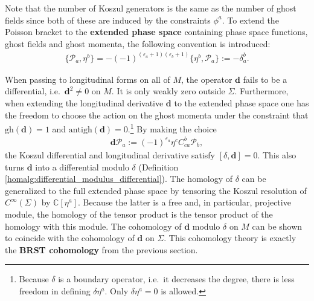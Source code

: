     Note that the number of Koszul generators is the same as the number of ghost fields since both of these are induced by the constraints $\phi^a$. To extend the Poisson bracket to the \textbf{extended phase space} containing phase space functions, ghost fields and ghost momenta, the following convention is introduced:
    \begin{gather}
        \{\mathcal{P}_a,\eta^b\} = -(-1)^{(\varepsilon_a+1)(\varepsilon_b+1)}\{\eta^b,\mathcal{P}_a\} := -\delta_a^b.
    \end{gather}

    When passing to longitudinal forms on all of $M$, the operator $\mathbf{d}$ fails to be a differential, i.e.~$\mathbf{d}^2\neq0$ on $M$. It is only weakly zero outside $\Sigma$. Furthermore, when extending the longitudinal derivative $\mathbf{d}$ to the extended phase space one has the freedom to choose the action on the ghost momenta under the constraint that $\mathrm{gh}(\mathbf{d})=1$ and $\mathrm{antigh}(\mathbf{d})=0$.\footnote{Because $\delta$ is a boundary operator, i.e.~it decreases the degree, there is less freedom in defining $\delta\eta^a$. Only $\delta\eta^a=0$ is allowed.} By making the choice
    \begin{gather}
        \mathbf{d}\mathcal{P}_a := (-1)^{\varepsilon_a}\eta^c C^b_{ca}\mathcal{P}_b,
    \end{gather}
    the Koszul differential and longitudinal derivative satisfy $[\delta,\mathbf{d}]=0$. This also turns $\mathbf{d}$ into a differential modulo $\delta$ (Definition \ref{homalg:differential_modulus_differential}). The homology of $\delta$ can be generalized to the full extended phase space by tensoring the Koszul resolution of $C^\infty(\Sigma)$ by $\mathbb{C}[\eta^a]$. Because the latter is a free and, in particular, projective module, the homology of the tensor product is the tensor product of the homology with this module. The cohomology of $\mathbf{d}$ modulo $\delta$ on $M$ can be shown to coincide with the cohomology of $\mathbf{d}$ on $\Sigma$. This cohomology theory is exactly the \textbf{BRST cohomology} from the previous section.

